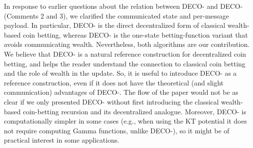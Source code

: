 \documentclass[12pt,english]{reviewresponse}
\newcommand{\algname}{{DECO}\xspace}
\begin{document}
\begin{revresponse}
    In response to earlier questions about the relation between \algname{}- and \algname{}- (Comments 2 and 3), we clarified the communicated state and per-message payload.
    In particular, \algname{}- is the direct decentralized form of classical wealth-based coin betting, whereas \algname{}- is the one-state betting-function variant that avoids communicating wealth.
    Nevertheless, both algorithms are our contribution.
    We believe that \algname{}- is a natural reference construction for decentralized coin betting, and helps the reader understand the connection to classical coin betting and the role of wealth in the update.
    So, it is useful to introduce \algname{}- as a reference construction, even if it does not have the theoretical (and slight communication) advantages of \algname{}-.
    The flow of the paper would not be as clear if we only presented \algname{}- without first introducing the classical wealth-based coin-betting recursion and its decentralized analogue.
    Moreover, \algname{}- is computationally simpler in some cases (e.g., when using the KT potential it does not require computing Gamma functions, unlike \algname{}-), so it might be of practical interest in some applications.


\end{revresponse}
\end{document}
